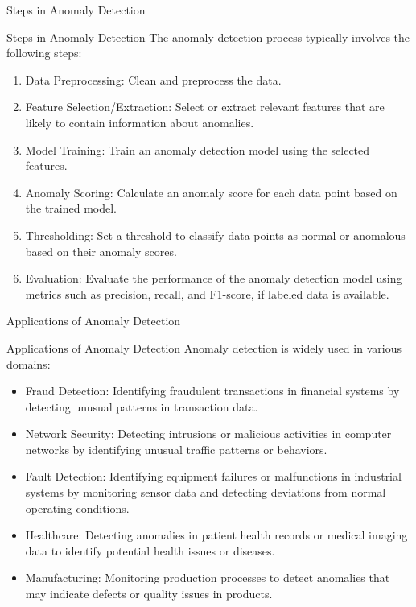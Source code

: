 \documentclass[hyperref={pdfpagelabels=false},aspectratio=169]{beamer}
\begin{document}
\begin{frame}[label={sec:org61d3a40}]{Steps in Anomaly Detection}
\begin{block}{Steps in Anomaly Detection}
\pause
The anomaly detection process typically involves the following steps:
\begin{enumerate}[<+->]
\item \alert{Data Preprocessing}: Clean and preprocess the data.
\item \alert{Feature Selection/Extraction}: Select or extract relevant features that are likely to contain information about anomalies.
\item \alert{Model Training}: Train an anomaly detection model using the selected features.
\item \alert{Anomaly Scoring}: Calculate an anomaly score for each data point based on the trained model.
\item \alert{Thresholding}: Set a threshold to classify data points as normal or anomalous based on their anomaly scores.
\item \alert{Evaluation}: Evaluate the performance of the anomaly detection model using metrics such as precision, recall, and F1-score, if labeled data is available.
\end{enumerate}
\end{block}
\end{frame}
\begin{frame}[label={sec:org1c4a546}]{Applications of Anomaly Detection}
\begin{block}{Applications of Anomaly Detection}
\pause
Anomaly detection is widely used in various domains:
\begin{itemize}[<+->]
\item \alert{\alert{Fraud Detection}}: Identifying fraudulent transactions in financial systems by detecting unusual patterns in transaction data.
\item \alert{\alert{Network Security}}: Detecting intrusions or malicious activities in computer networks by identifying unusual traffic patterns or behaviors.
\item \alert{\alert{Fault Detection}}: Identifying equipment failures or malfunctions in industrial systems by monitoring sensor data and detecting deviations from normal operating conditions.
\item \alert{\alert{Healthcare}}: Detecting anomalies in patient health records or medical imaging data to identify potential health issues or diseases.
\item \alert{\alert{Manufacturing}}: Monitoring production processes to detect anomalies that may indicate defects or quality issues in products.
\end{itemize}
\end{block}
\end{frame}
\end{document}
